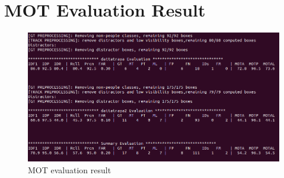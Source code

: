         \section{MOT Evaluation Result}
        \begin{figure}[h]
                \centering
                \includegraphics[width=1\textwidth]{img/mot_evaluation.png}
                \caption{MOT evaluation result}    
        \end{figure}
